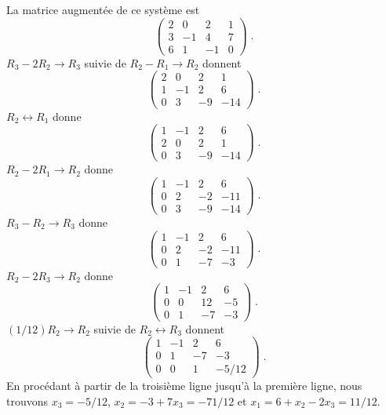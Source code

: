 {
La matrice augmentée de ce système est
\[
\left(\begin{array}{rrr|r}
2 & 0 & 2 & 1 \\ 3 & -1 & 4 & 7 \\ 6 & 1 & -1 & 0
\end{array}\right) \; .
\]
$R_3 - 2R_2 \to R_3$ suivie de $R_2 - R_1 \to R_2$ donnent
\[
\left(\begin{array}{rrr|r}
2 & 0 & 2 & 1 \\ 1 & -1 & 2 & 6 \\ 0 & 3 & -9 & -14
\end{array}\right) \; .
\]
$R_2 \leftrightarrow R_1$ donne
\[
\left(\begin{array}{rrr|r}
1 & -1 & 2 & 6 \\ 2 & 0 & 2 & 1 \\ 0 & 3 & -9 & -14
\end{array}\right) \; .
\]
$R_2 - 2 R_1 \to R_2$ donne
\[
\left(\begin{array}{rrr|r}
1 & -1 & 2 & 6 \\ 0 & 2 & -2 & -11 \\ 0 & 3 & -9 & -14
\end{array}\right) \; .
\]
$R_3 - R_2 \to R_3$ donne
\[
\left(\begin{array}{rrr|r}
1 & -1 & 2 & 6 \\ 0 & 2 & -2 & -11 \\ 0 & 1 & -7 & -3
\end{array}\right) \; .
\]
$R_2 - 2 R_3 \to R_2$ donne
\[
\left(\begin{array}{rrr|r}
1 & -1 & 2 & 6 \\ 0 & 0 & 12 & -5 \\ 0 & 1 & -7 & -3
\end{array}\right) \; .
\]
$(1/12) R_2 \to R_2$ suivie de $R_2 \leftrightarrow R_3$ donnent
\[
\left(\begin{array}{rrr|r}
1 & -1 & 2 & 6 \\ 0 & 1 & -7 & -3 \\ 0 & 0 & 1 & -5/12
\end{array}\right) \; .
\]
En procédant à partir de la troisième ligne jusqu'à la première ligne, nous
trouvons $x_3 = -5/12$, $x_2 = -3 + 7 x_3 = -71/12$ et
$x_1 = 6 + x_2 -2 x_3 = 11/12$.

}
